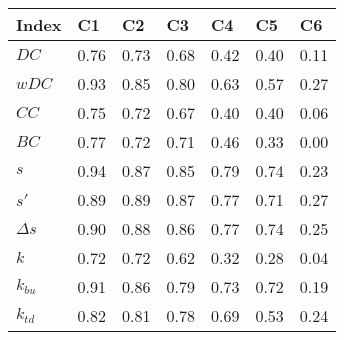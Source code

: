 \begin{table}[ht]
\centering
\begin{tabular}{lllllll}
  \hline
Index & C1 & C2 & C3 & C4 & C5 & C6 \\ 
  \hline
\(\displaystyle DC \) & {\color[HTML]{00D768} 0.76} & {\color[HTML]{EF2A00} 0.73} & {\color[HTML]{0051D7} 0.68} & {\color[HTML]{6200D7} 0.42} & {\color{orange} 0.40} & {\color[HTML]{9B9B9B} 0.11} \\ 
\(\displaystyle wDC \) &   {\color[HTML]{EF2A00} 0.93} & {\color[HTML]{00D768} 0.85} & {\color[HTML]{0051D7} 0.80} & {\color{orange} 0.63} & {\color[HTML]{6200D7} 0.57} & {\color[HTML]{9B9B9B} 0.27} \\ 
\(\displaystyle CC \) &   {\color[HTML]{00D768} 0.75} & {\color[HTML]{EF2A00} 0.72} & {\color[HTML]{0051D7} 0.67} & {\color[HTML]{6200D7} 0.40} & {\color{orange} 0.40} & {\color[HTML]{9B9B9B} 0.06} \\ 
\(\displaystyle BC \) &   {\color[HTML]{00D768} 0.77} & {\color[HTML]{0051D7} 0.72} & {\color[HTML]{EF2A00} 0.71} & {\color{orange} 0.46} & {\color[HTML]{6200D7} 0.33} & {\color[HTML]{9B9B9B} 0.00} \\ 
\(\displaystyle s \) &   {\color[HTML]{00D768} 0.94} & {\color[HTML]{EF2A00} 0.87} & {\color[HTML]{0051D7} 0.85} & {\color{orange} 0.79} & {\color[HTML]{6200D7} 0.74} & {\color[HTML]{9B9B9B} 0.23} \\ 
\(\displaystyle s' \) &   {\color[HTML]{EF2A00} 0.89} & {\color[HTML]{0051D7} 0.89} & {\color[HTML]{00D768} 0.87} & {\color[HTML]{6200D7} 0.77} & {\color{orange} 0.71} & {\color[HTML]{9B9B9B} 0.27} \\ 
\(\displaystyle \Delta s \) &   {\color[HTML]{00D768} 0.90} & {\color[HTML]{EF2A00} 0.88} & {\color[HTML]{0051D7} 0.86} & {\color[HTML]{6200D7} 0.77} & {\color{orange} 0.74} & {\color[HTML]{9B9B9B} 0.25} \\ 
\(\displaystyle k \) &   {\color[HTML]{00D768} 0.72} & {\color[HTML]{EF2A00} 0.72} & {\color[HTML]{0051D7} 0.62} & {\color[HTML]{6200D7} 0.32} & {\color{orange} 0.28} & {\color[HTML]{9B9B9B} 0.04} \\ 
\(\displaystyle k_{bu} \) &   {\color[HTML]{00D768} 0.91} & {\color[HTML]{EF2A00} 0.86} & {\color[HTML]{0051D7} 0.79} & {\color[HTML]{6200D7} 0.73} & {\color{orange} 0.72} & {\color[HTML]{9B9B9B} 0.19} \\ 
\(\displaystyle k_{td} \) &   {\color[HTML]{EF2A00} 0.82} & {\color[HTML]{00D768} 0.81} & {\color[HTML]{0051D7} 0.78} & {\color[HTML]{6200D7} 0.69} & {\color{orange} 0.53} & {\color[HTML]{9B9B9B} 0.24} \\ 

\end{tabular}
\end{table}
